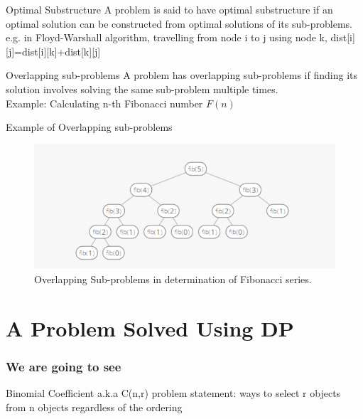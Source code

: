 \documentclass{beamer}
\begin{document}
\begin{frame}{Optimal Substructure}
    A problem is said to have optimal substructure if an optimal
solution can be constructed from optimal solutions of its
sub-problems.\\
e.g. in \color{blue} Floyd-Warshall \color{black} algorithm,  travelling from node i to j using
node k, dist[i][j]=dist[i][k]+dist[k][j]
\end{frame}

\begin{frame}{Overlapping sub-problems}
    A problem has overlapping sub-problems if finding its solution
involves solving the same sub-problem multiple times.\\
Example: Calculating n-th Fibonacci number $F (n)$
\end{frame}

\begin{frame}{Example of Overlapping sub-problems}
\begin{figure}
    \centering
    \includegraphics[scale = 0.5]{Fib.PNG}
    \caption{Overlapping Sub-problems in determination of Fibonacci series.}
    \label{fig:my_label}
\end{figure}

\end{frame}

\section{A Problem Solved Using DP}

\begin{frame}
\frametitle{We are going to see}

    \tableofcontents
\end{frame}

\begin{frame}{Binomial Coefficient a.k.a C(n,r)}
problem statement: \color{red} ways to select \color{black} r objects from n objects
regardless of the ordering 
\end{frame}
\end{document}
